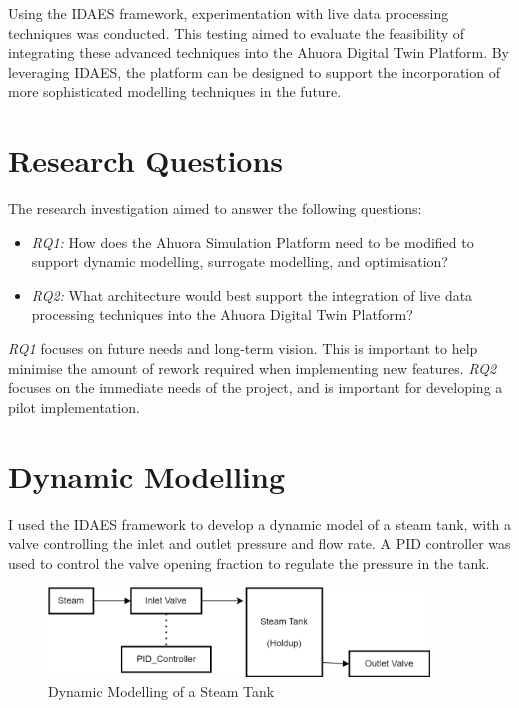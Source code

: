 \documentclass[12pt]{report}
\begin{document}
Using the IDAES framework, experimentation with live data processing techniques was conducted. This testing aimed to evaluate the feasibility of integrating these advanced techniques into the Ahuora Digital Twin Platform. By leveraging IDAES, the platform can be designed to support the incorporation of more sophisticated modelling techniques in the future.

\section{Research Questions}

The research investigation aimed to answer the following questions:

\begin{itemize}
    \item \textit{RQ1:} How does the Ahuora Simulation Platform need to be modified to support dynamic modelling, surrogate modelling, and optimisation?
    \item \textit{RQ2:} What architecture would best support the integration of live data processing techniques into the Ahuora Digital Twin Platform?
\end{itemize}

\textit{RQ1} focuses on future needs and long-term vision. This is important to help minimise the amount of rework required when implementing new features. \textit{RQ2} focuses on the immediate needs of the project, and is important for developing a pilot implementation.

\section{Dynamic Modelling} 

I used the IDAES framework to develop a dynamic model of a steam tank, with a valve controlling the inlet and outlet pressure and flow rate. A PID controller was used to control the valve opening fraction to regulate the pressure in the tank.

\begin{figure}
    \includegraphics[width=0.9\textwidth]{dynamicmodelling.png}
    \caption{Dynamic Modelling of a Steam Tank}
    \label{fig:dynamicmodelling}
\end{figure}
\end{document}
